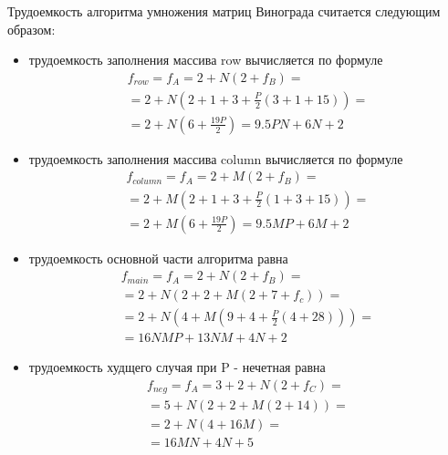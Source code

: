 Трудоемкость алгоритма умножения матриц Винограда считается следующим образом:
\begin{itemize}[left=\parindent]
    \item трудоемкость заполнения массива row вычисляется по формуле
        \begin{multline}\label{mulHeq}
            f_{row} = f_A = 2 + N(2 + f_B) = \\ = 2 + N(2 +
                       1 + 3 + \frac{P}{2}(3 + 1 + 15)) = \\ = 2 +
                       N(6 + \frac{19P}{2}) = 9.5PN + 6N + 2
        \end{multline}

    \item трудоемкость заполнения массива column вычисляется по формуле
        \begin{multline}\label{mulVeq}
            f_{column} = f_A = 2 + M(2 + f_B) = \\ = 2 +
            M(2 + 1 + 3 + \frac{P}{2}(1 + 3 + 15)) = \\ = 2 + M(6 +
            \frac{19P}{2}) = 9.5MP + 6M + 2
        \end{multline}
    
    \item трудоемкость основной части алгоритма равна
        \begin{multline}\label{winmainbesteq}
            f_{main} = f_A = 2 + N(2 + f_B) = \\ =  2 + N(2 + 2 + M(2
            + 7 + f_c)) = \\ = 2 + N(4 + M(9 + 4 + \frac{P}{2}(4 + 28))) =
            \\ = 16NMP + 13NM + 4N + 2
        \end{multline}

    \clearpage
    \item трудоемкость худщего случая при P - нечетная равна
        \begin{multline}\label{winmainworseeq}
            f_{neg} = f_A = 3 + 2 + N(2 + f_C) = \\ =  5 + N(2 + 2 + M(2 +
            14)) = \\ = 2 + N(4 + 16M) = \\ = 16MN + 4N + 5
        \end{multline}
\end{itemize}

